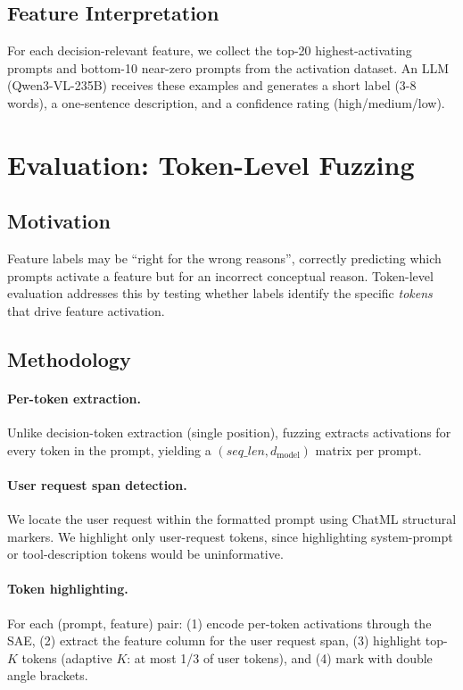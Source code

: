 \documentclass[runningheads]{llncs}
\begin{document}
\subsection{Feature Interpretation}

For each decision-relevant feature, we collect the top-20 highest-activating prompts and bottom-10 near-zero prompts from the activation dataset. An LLM (Qwen3-VL-235B) receives these examples and generates a short label (3-8 words), a one-sentence description, and a confidence rating (high/medium/low).


\section{Evaluation: Token-Level Fuzzing}
\label{sec:evaluation}

\subsection{Motivation}

Feature labels may be ``right for the wrong reasons'', correctly predicting which prompts activate a feature but for an incorrect conceptual reason. Token-level evaluation addresses this by testing whether labels identify the specific \emph{tokens} that drive feature activation.

\subsection{Methodology}

\paragraph{Per-token extraction.} Unlike decision-token extraction (single position), fuzzing extracts activations for every token in the prompt, yielding a $(seq\_len, d_\text{model})$ matrix per prompt.

\paragraph{User request span detection.} We locate the user request within the formatted prompt using ChatML structural markers. We highlight only user-request tokens, since highlighting system-prompt or tool-description tokens would be uninformative.

\paragraph{Token highlighting.} For each (prompt, feature) pair: (1) encode per-token activations through the SAE, (2) extract the feature column for the user request span, (3) highlight top-$K$ tokens (adaptive $K$: at most 1/3 of user tokens), and (4) mark with double angle brackets.
\end{document}
